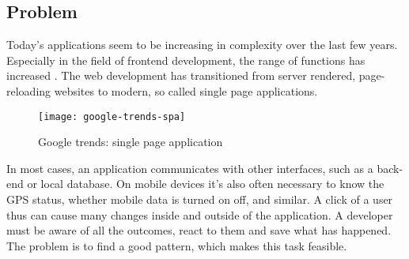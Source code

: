 \subsection{Problem}
\label{subsec:problem}

Today's applications seem to be increasing in complexity over the last few years. 
Especially in the field of frontend development, the range of functions has increased \cite{kevin2018}.
The web development has transitioned from server rendered, page-reloading websites to modern, so called single page applications.

\begin{figure}[h]
\texttt{[image: google-trends-spa]}
\centering
\caption{Google trends: single page application}
\label{fig:google-trends-spa}
\end{figure}

In most cases, an application communicates with other interfaces, such as a back-end or local database.
On mobile devices it's also often necessary to know the GPS status, whether mobile data is turned on off, and similar. 
A click of a user thus can cause many changes inside and outside of the application.
A developer must be aware of all the outcomes, react to them and save what has happened. The problem is to find a good pattern, which makes this task feasible.